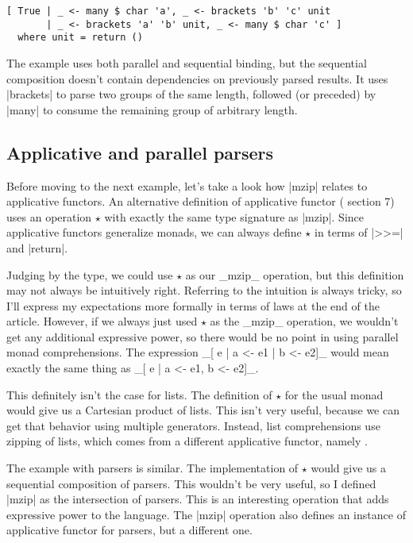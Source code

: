 \documentclass{tmr}
\begin{document}
\begin{verbatim}
[ True | _ <- many $ char 'a', _ <- brackets 'b' 'c' unit
       | _ <- brackets 'a' 'b' unit, _ <- many $ char 'c' ]
  where unit = return ()
\end{verbatim}
The example uses both parallel and sequential binding, but the sequential composition doesn't
contain dependencies on previously parsed results. It uses |brackets| to parse two groups of the
same length, followed (or preceded) by |many| to consume the remaining group of arbitrary length.


\subsection{Applicative and parallel parsers}
Before moving to the next example, let's take a look how |mzip| relates to applicative functors.
An alternative definition of applicative functor (\cite{applicative} section 7) uses an operation
$\star$ with exactly the same type signature as |mzip|. Since applicative functors generalize
monads, we can always define $\star$ in terms of |>>=| and |return|. 

\UndefineShortVerb{\|}
\DefineShortVerb{\_}

Judging by the type, we could use $\star$ as our _mzip_ operation, but this definition may not
always be intuitively right. Referring to the intuition is always tricky, so I'll express my 
expectations more formally in terms of laws at the end of the article. However, if we always just 
used $\star$ as the _mzip_ operation, we wouldn't get any additional expressive power, so there 
would be no point in using parallel monad comprehensions. The expression _[ e | a <- e1 | b <- e2]_
would mean exactly the same thing as _[ e | a <- e1, b <- e2]_.

\UndefineShortVerb{\_}
\DefineShortVerb{\|}

This definitely isn't the case for lists. The definition of $\star$ for the usual 
monad would give us a Cartesian product of lists. This isn't very useful, because we can get that
behavior using multiple generators. Instead, list comprehensions use zipping of lists, which comes 
from a different applicative functor, namely .

The example with parsers is similar. The implementation of $\star$ would give us a sequential 
composition of parsers. This wouldn't be very useful, so I defined |mzip| as the intersection of 
parsers. This is an interesting operation that adds expressive power to the language. The |mzip| 
operation also defines an instance of applicative functor for parsers, but a different one.
\end{document}
